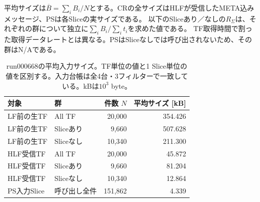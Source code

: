 
平均サイズは$\overline{B}=\sum_i B_i/N$とする。CRの全サイズはHLFが受信したMETA込みメッセージ、PSは各Sliceの実サイズである。
以下のSliceあり／なしの$R_\Sigma$は、それぞれの群について独立に$\sum_i B_i/\sum_i t_i$を求めた値である。
TF取得時間で割った取得データレートとは異なる。PSはSliceなしでは呼び出されないため、その群はN/Aである。

\begin{table}[htbp]
 \centering
 \caption{run000668の平均入力サイズ。TF単位の値と1 Slice単位の値を区別する。入力台帳は全4台・3フィルターで一致している。kBは$10^3$ byte。}
 \begin{tabular}{llrr}\hline
 対象 & 群 & 件数 $N$ & 平均サイズ [kB] \\ \hline
 LF前の生TF & All TF & 20,000 & 354.426 \\
 LF前の生TF & Sliceあり & 9,660 & 507.628 \\
 LF前の生TF & Sliceなし & 10,340 & 211.300 \\
 HLF受信TF & All TF & 20,000 & 45.872 \\
 HLF受信TF & Sliceあり & 9,660 & 81.204 \\
 HLF受信TF & Sliceなし & 10,340 & 12.864 \\
 PS入力Slice & 呼び出し全件 & 151,862 & 4.339 \\
 \hline\end{tabular}
\end{table}

